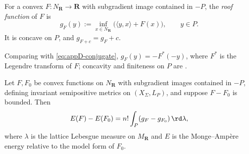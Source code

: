 \begin{definition}
\label{def:ch26-roof}
For a convex \(F:N_{\mathbf R}\to\mathbf R\) with subgradient image contained
in \(-P\), the \emph{roof function} of \(F\) is
\begin{equation}
\label{eq:ch26-roof}
 g_F(y):=\inf_{x\in N_{\mathbf R}}
   \bigl(\langle y,x\rangle+F(x)\bigr),
 \qquad y\in P .
\end{equation}
It is concave on \(P\), and \(g_{F+c}=g_F+c\).
\end{definition}

Comparing with \eqref{eq:appD-conjugate}, \(g_F(y)=-F^*(-y)\), where \(F^*\)
is the Legendre transform of \(F\); concavity and finiteness on \(P\) are
.

\begin{theorem}
\label{thm:ch26-toric-energy}
Let \(F,F_0\) be convex functions on \(N_{\mathbf R}\) with subgradient
images contained in \(-P\), defining invariant semipositive metrics on
\((X_\Sigma,L_P)\), and suppose \(F-F_0\) is bounded.  Then
\begin{equation}
\label{eq:ch26-toric-energy}
 E(F)-E(F_0)=n!\int_P(g_F-g_{F_0})\,\rd\lambda,
\end{equation}
where \(\lambda\) is the lattice Lebesgue measure on \(M_{\mathbf R}\) and
\(E\) is the Monge--Amp\`ere energy relative to the model form of \(F_0\).
\end{theorem}

